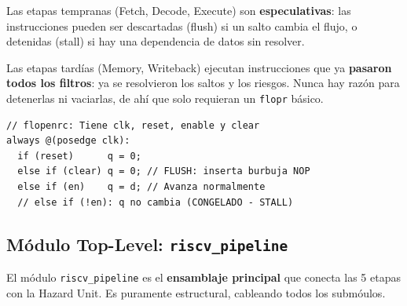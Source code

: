 \documentclass[12pt, a4paper]{article}
\begin{document}
Las etapas tempranas (Fetch, Decode, Execute) son \textbf{especulativas}: las instrucciones pueden ser descartadas (flush) si un salto cambia el flujo, o detenidas (stall) si hay una dependencia de datos sin resolver.

Las etapas tardías (Memory, Writeback) ejecutan instrucciones que ya \textbf{pasaron todos los filtros}: ya se resolvieron los saltos y los riesgos. Nunca hay razón para detenerlas ni vaciarlas, de ahí que solo requieran un \texttt{flopr} básico.

\begin{lstlisting}[style=pseudo, caption={Comportamiento de los registros pipeline}]
// flopenrc: Tiene clk, reset, enable y clear
always @(posedge clk):
  if (reset)      q = 0;
  else if (clear) q = 0; // FLUSH: inserta burbuja NOP
  else if (en)    q = d; // Avanza normalmente
  // else if (!en): q no cambia (CONGELADO - STALL)
\end{lstlisting}

\subsection{Módulo Top-Level: \texttt{riscv\_pipeline}}

El módulo \texttt{riscv\_pipeline} es el \textbf{ensamblaje principal} que conecta las 5 etapas con la Hazard Unit. Es puramente estructural, cableando todos los submóulos.
\end{document}
